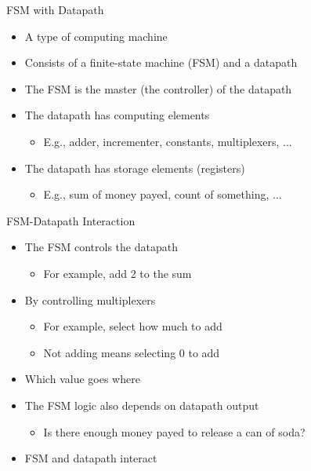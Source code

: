 
\begin{frame}[fragile]{FSM with Datapath}
\begin{itemize}
\item A type of computing machine
\item Consists of a finite-state machine (FSM) and a datapath
\item The FSM is the master (the controller) of the datapath
\item The datapath has computing elements
\begin{itemize}
\item E.g., adder, incrementer, constants, multiplexers, ...
\end{itemize}
\item The datapath has storage elements (registers)
\begin{itemize}
\item E.g., sum of money payed, count of something, ...
\end{itemize}
\end{itemize}
\end{frame}

\begin{frame}[fragile]{FSM-Datapath Interaction}
\begin{itemize}
\item The FSM controls the datapath
\begin{itemize}
\item For example, add 2 to the sum
\end{itemize}
\item By controlling multiplexers
\begin{itemize}
\item For example, select how much to add
\item Not adding means selecting 0 to add
\end{itemize}
\item Which value goes where
\item The FSM logic also depends on datapath output
\begin{itemize}
\item Is there enough money payed to release a can of soda?
\end{itemize}
\item FSM and datapath interact
\end{itemize}
\end{frame}





